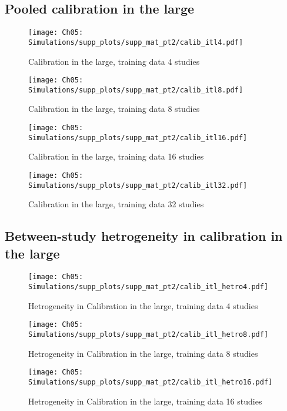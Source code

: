 
\subsection{Pooled calibration in the large}
\begin{figure}[H]
  \centering
  \texttt{[image: Ch05: Simulations/supp\_plots/supp\_mat\_pt2/calib\_itl4.pdf]}
  \caption{Calibration in the large, training data 4 studies}
\end{figure}

\begin{figure}[H]
  \centering
  \texttt{[image: Ch05: Simulations/supp\_plots/supp\_mat\_pt2/calib\_itl8.pdf]}
  \caption{Calibration in the large, training data 8 studies}
\end{figure}

\begin{figure}[H]
  \centering
  \texttt{[image: Ch05: Simulations/supp\_plots/supp\_mat\_pt2/calib\_itl16.pdf]}
  \caption{Calibration in the large, training data 16 studies}
\end{figure}

\begin{figure}[H]
  \centering
  \texttt{[image: Ch05: Simulations/supp\_plots/supp\_mat\_pt2/calib\_itl32.pdf]}
  \caption{Calibration in the large, training data 32 studies}
\end{figure}

\subsection{Between-study hetrogeneity in calibration in the large}
\begin{figure}[H]
  \centering
  \texttt{[image: Ch05: Simulations/supp\_plots/supp\_mat\_pt2/calib\_itl\_hetro4.pdf]}
  \caption{Hetrogeneity in Calibration in the large, training data 4 studies}
\end{figure}

\begin{figure}[H]
  \centering
  \texttt{[image: Ch05: Simulations/supp\_plots/supp\_mat\_pt2/calib\_itl\_hetro8.pdf]}
  \caption{Hetrogeneity in Calibration in the large, training data 8 studies}
\end{figure}

\begin{figure}[H]
  \centering
  \texttt{[image: Ch05: Simulations/supp\_plots/supp\_mat\_pt2/calib\_itl\_hetro16.pdf]}
  \caption{Hetrogeneity in Calibration in the large, training data 16 studies}
\end{figure}

